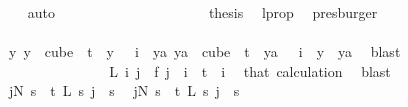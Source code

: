 \begin{isabellebody}
\ {}\ \isamarkupfalse%
\ auto\isanewline
\ \ \ \ \ \ \ \ \ \ \ \ \ \ \ \ \ \ \isamarkupfalse%
\ \isamarkupfalse%
\ {\isacharquery}{\kern0pt}thesis\ \isamarkupfalse%
\ l{\isacharunderscore}{\kern0pt}prop\ \isamarkupfalse%
\ presburger\isanewline
\ \ \ \ \ \ \ \ \ \ \ \ \ \ \ \ \isamarkupfalse%
\isanewline
\ \ \ \ \ \ \ \ \ \ \ \ \ \ \isamarkupfalse%
\isanewline
\ \ \ \ \ \ \ \ \ \ \ \ \ \ \isamarkupfalse%
\ \isamarkupfalse%
\ {\isachardoublequoteopen}{\isasymexists}y{\isachardot}{\kern0pt}\ {\isacharparenleft}{\kern0pt}y\ {\isasymin}\ cube\ {}\ t\ {\isasymand}\ y\ {}\ {\isacharequal}{\kern0pt}\ i{\isacharparenright}{\kern0pt}\ {\isasymand}\ {\isacharparenleft}{\kern0pt}{\isasymforall}ya{\isachardot}{\kern0pt}\ ya\ {\isasymin}\ cube\ {}\ t\ {\isasymand}\ ya\ {}\ {\isacharequal}{\kern0pt}\ i\ {\isasymlongrightarrow}\ y\ {\isacharequal}{\kern0pt}\ ya{\isacharparenright}{\kern0pt}{\isachardoublequoteclose}\ \isamarkupfalse%
\ blast\isanewline
\ \ \ \ \ \ \ \ \ \ \ \ \isamarkupfalse%
\isanewline
\isanewline
\ \ \ \ \ \ \ \ \ \ \ \ \isamarkupfalse%
\ \isamarkupfalse%
\ {\isachardoublequoteopen}L\ i\ j\ {\isacharequal}{\kern0pt}\ f\ j{\isachardoublequoteclose}\ \ {\isachardoublequoteopen}i\ {\isacharless}{\kern0pt}\ t{\isachardoublequoteclose}\ \ i\ \isamarkupfalse%
\ that\ calculation\ \isamarkupfalse%
\ blast\isanewline
\ \ \ \ \ \ \ \ \ \ \ \ \isamarkupfalse%
\ \isamarkupfalse%
\ {\isachardoublequoteopen}{\isacharparenleft}{\kern0pt}{\isasymexists}j{\isacharless}{\kern0pt}N{\isacharprime}{\kern0pt}{\isachardot}{\kern0pt}\ {\isacharparenleft}{\kern0pt}{\isasymforall}s\ {\isacharless}{\kern0pt}\ t{\isachardot}{\kern0pt}\ L\ s\ j\ {\isacharequal}{\kern0pt}\ s{\isacharparenright}{\kern0pt}{\isacharparenright}{\kern0pt}{\isachardoublequoteclose}\ \isamarkupfalse%
\ {\isacartoucheopen}{\isacharparenleft}{\kern0pt}{\isasymexists}j{\isacharless}{\kern0pt}N{\isacharprime}{\kern0pt}{\isachardot}{\kern0pt}\ {\isacharparenleft}{\kern0pt}{\isasymforall}s\ {\isacharless}{\kern0pt}\ t{\isachardot}{\kern0pt}\ L{\isacharprime}{\kern0pt}\ s\ j\ {\isacharequal}{\kern0pt}\ s{\isacharparenright}{\kern0pt}{\isacharparenright}{\kern0pt}{\isacartoucheclose}\ \isamarkupfalse%

\end{isabellebody}
